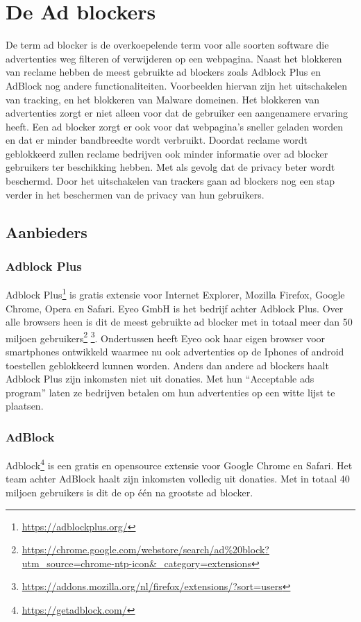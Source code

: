 \documentclass[pdftex,a4paper,12pt,twoside]{report}
\begin{document}
\chapter{De Ad blockers}
\label{ch:De Ad blockers}
De term ad blocker is de overkoepelende term voor alle soorten software die advertenties weg filteren of verwijderen op een webpagina. Naast het blokkeren van reclame hebben de meest gebruikte ad blockers zoals Adblock Plus en AdBlock nog andere functionaliteiten. Voorbeelden hiervan zijn het uitschakelen van tracking, en het blokkeren van Malware domeinen. Het blokkeren van advertenties zorgt er niet alleen voor dat de gebruiker een aangenamere ervaring heeft. Een ad blocker zorgt er ook voor dat webpagina’s sneller geladen worden en dat er minder bandbreedte wordt verbruikt. Doordat reclame wordt geblokkeerd zullen reclame bedrijven ook minder informatie over ad blocker gebruikers ter beschikking hebben. Met als gevolg dat de privacy beter wordt beschermd. Door het uitschakelen van trackers gaan ad blockers nog een stap verder in het beschermen van de privacy van hun gebruikers.
\section{Aanbieders}
\label{sec:Aanbieders}
\subsection{Adblock Plus}
\label{sec:Adblock Plus}
Adblock Plus\footnote{\url{https://adblockplus.org/}} is gratis extensie voor Internet Explorer, Mozilla Firefox, Google Chrome, Opera en Safari. Eyeo GmbH is het bedrijf achter Adblock Plus. Over alle browsers heen is dit de meest gebruikte ad blocker met in totaal meer dan 50 miljoen gebruikers\footnote{\url{https://chrome.google.com/webstore/search/ad\%20block?utm_source=chrome-ntp-icon&_category=extensions}} \footnote{\url{https://addons.mozilla.org/nl/firefox/extensions/?sort=users}}. Ondertussen heeft Eyeo ook haar eigen browser voor smartphones ontwikkeld waarmee nu ook advertenties op de Iphones of android toestellen geblokkeerd kunnen worden. Anders dan andere ad blockers haalt Adblock Plus zijn inkomsten niet uit donaties. Met hun "`Acceptable ads program"' laten ze bedrijven betalen om hun advertenties op een witte lijst te plaatsen.
\subsection{AdBlock}
\label{sec:AdBlock}
Adblock\footnote{\url{https://getadblock.com/}} is een gratis en opensource extensie voor Google Chrome en Safari. Het team achter AdBlock haalt zijn inkomsten volledig uit donaties. Met in totaal 40 miljoen gebruikers is dit de op één na grootste ad blocker.
\end{document}
